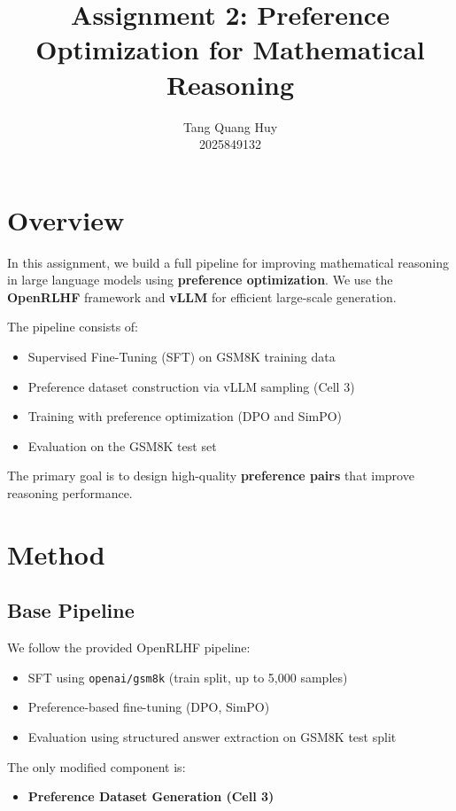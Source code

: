 \documentclass{article}
\title{Assignment 2: Preference Optimization for Mathematical Reasoning}
\author{
    Tang Quang Huy \\
    2025849132
}
\begin{document}
\maketitle

\section{Overview}

In this assignment, we build a full pipeline for improving mathematical reasoning in large language models using \textbf{preference optimization}. We use the \textbf{OpenRLHF} framework and \textbf{vLLM} for efficient large-scale generation.

The pipeline consists of:
\begin{itemize}
    \item Supervised Fine-Tuning (SFT) on GSM8K training data
    \item Preference dataset construction via vLLM sampling (Cell 3)
    \item Training with preference optimization (DPO and SimPO)
    \item Evaluation on the GSM8K test set
\end{itemize}

The primary goal is to design high-quality \textbf{preference pairs} that improve reasoning performance.

\section{Method}

\subsection{Base Pipeline}

We follow the provided OpenRLHF pipeline:

\begin{itemize}
    \item SFT using \texttt{openai/gsm8k} (train split, up to 5{,}000 samples)
    \item Preference-based fine-tuning (DPO, SimPO)
    \item Evaluation using structured answer extraction on GSM8K test split
\end{itemize}

The only modified component is:

\begin{itemize}
    \item \textbf{Preference Dataset Generation (Cell 3)}
\end{itemize}
\end{document}
